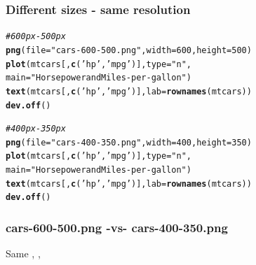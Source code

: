 \documentclass[12pt]{beamer}\usepackage[]{graphicx}\usepackage[]{color}
\makeatletter
\newcommand{\hlnum}[1]{\textcolor[rgb]{0.686,0.059,0.569}{#1}}%
\newcommand{\hlstr}[1]{\textcolor[rgb]{0.192,0.494,0.8}{#1}}%
\newcommand{\hlcom}[1]{\textcolor[rgb]{0.678,0.584,0.686}{\textit{#1}}}%
\newcommand{\hlstd}[1]{\textcolor[rgb]{0.345,0.345,0.345}{#1}}%
\newcommand{\hlkwc}[1]{\textcolor[rgb]{0.333,0.667,0.333}{#1}}%
\newcommand{\hlkwd}[1]{\textcolor[rgb]{0.737,0.353,0.396}{\textbf{#1}}}%
\newenvironment{kframe}{%
 \def\at@end@of@kframe{}%
 \ifinner\ifhmode%
  \def\at@end@of@kframe{\end{minipage}}%
  \begin{minipage}{\columnwidth}%
 \fi\fi%
 \def\FrameCommand##1{\hskip\@totalleftmargin \hskip-\fboxsep
 \colorbox{shadecolor}{##1}\hskip-\fboxsep
     \hskip-\linewidth \hskip-\@totalleftmargin \hskip\columnwidth}%
 \MakeFramed {\advance\hsize-\width
   \@totalleftmargin\z@ \linewidth\hsize
   \@setminipage}}%
 {\par\unskip\endMakeFramed%
 \at@end@of@kframe}
\newenvironment{knitrout}{}{} %
\makeatother
\begin{document}

\begin{frame}[fragile]
\frametitle{Different sizes - same resolution}

\begin{knitrout}\footnotesize
{}\color{fgcolor}\begin{kframe}
\begin{alltt}
\hlcom{# 600px - 500px}
\hlkwd{png}\hlstd{(}\hlkwc{file} \hlstd{=} \hlstr{"cars-600-500.png"}\hlstd{,} \hlkwc{width} \hlstd{=} \hlnum{600}\hlstd{,} \hlkwc{height} \hlstd{=} \hlnum{500}\hlstd{)}
\hlkwd{plot}\hlstd{(mtcars[ ,}\hlkwd{c}\hlstd{(}\hlstr{'hp'}\hlstd{,} \hlstr{'mpg'}\hlstd{)],} \hlkwc{type} \hlstd{=} \hlstr{"n"}\hlstd{,}
     \hlkwc{main} \hlstd{=} \hlstr{"Horsepower and Miles-per-gallon"}\hlstd{)}
\hlkwd{text}\hlstd{(mtcars[ ,}\hlkwd{c}\hlstd{(}\hlstr{'hp'}\hlstd{,} \hlstr{'mpg'}\hlstd{)],} \hlkwc{lab} \hlstd{=} \hlkwd{rownames}\hlstd{(mtcars))}
\hlkwd{dev.off}\hlstd{()}


\hlcom{# 400px - 350px}
\hlkwd{png}\hlstd{(}\hlkwc{file} \hlstd{=} \hlstr{"cars-400-350.png"}\hlstd{,} \hlkwc{width} \hlstd{=} \hlnum{400}\hlstd{,} \hlkwc{height} \hlstd{=} \hlnum{350}\hlstd{)}
\hlkwd{plot}\hlstd{(mtcars[ ,}\hlkwd{c}\hlstd{(}\hlstr{'hp'}\hlstd{,} \hlstr{'mpg'}\hlstd{)],} \hlkwc{type} \hlstd{=} \hlstr{"n"}\hlstd{,}
     \hlkwc{main} \hlstd{=} \hlstr{"Horsepower and Miles-per-gallon"}\hlstd{)}
\hlkwd{text}\hlstd{(mtcars[ ,}\hlkwd{c}\hlstd{(}\hlstr{'hp'}\hlstd{,} \hlstr{'mpg'}\hlstd{)],} \hlkwc{lab} \hlstd{=} \hlkwd{rownames}\hlstd{(mtcars))}
\hlkwd{dev.off}\hlstd{()}
\end{alltt}
\end{kframe}
\end{knitrout}

\end{frame}


\begin{frame}
\frametitle{cars-600-500.png -vs- cars-400-350.png}
\begin{center}

Same , , 
\end{center}
\end{frame}

\end{document}
